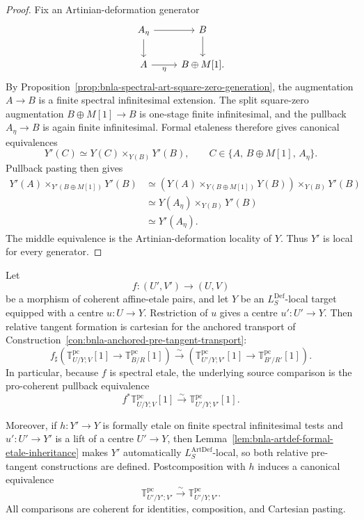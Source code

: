 \begin{proof}
Fix an Artinian-deformation generator
\[
\begin{tikzcd}
A_\eta \arrow[r] \arrow[d] & B \arrow[d]\\
A \arrow[r,"\eta"'] & B\oplus M[1].
\end{tikzcd}
\]
By Proposition~\ref{prop:bnla-spectral-art-square-zero-generation}, the
augmentation $A\to B$ is a finite spectral infinitesimal extension.  The
split square-zero augmentation $B\oplus M[1]\to B$ is one-stage finite
infinitesimal, and the pullback $A_\eta\to B$ is again finite infinitesimal.
Formal etaleness therefore gives canonical equivalences
\[
    Y'(C)
    \simeq
    Y(C)\times_{Y(B)}Y'(B),
    \qquad
    C\in\{A,\,B\oplus M[1],\,A_\eta\}.
\]
Pullback pasting then gives
\[
\begin{aligned}
    Y'(A)\times_{Y'(B\oplus M[1])}Y'(B)
    &\simeq
    \left(
        Y(A)\times_{Y(B\oplus M[1])}Y(B)
    \right)
    \times_{Y(B)}Y'(B)\\
    &\simeq
    Y(A_\eta)\times_{Y(B)}Y'(B)\\
    &\simeq
    Y'(A_\eta).
\end{aligned}
\]
The middle equivalence is the Artinian-deformation locality of $Y$.  Thus
$Y'$ is local for every generator.
\end{proof}

\begin{theorem}
\label{thm:bnla-pre-tangent-etale-base-change}
Let
\[
    f:(U',V')\longrightarrow(U,V)
\]
be a morphism of coherent affine-etale pairs, and let $Y$ be an
$L_S^{\mathrm{Def}}$-local target equipped with a centre $u:U\to Y$.
Restriction of $u$ gives a centre $u':U'\to Y$.  Then relative tangent
formation is cartesian for the anchored transport of
Construction~\ref{con:bnla-anchored-pre-tangent-transport}:
\[
\boxed{
    f_\sharp
    \left(
        \mathbb T^{\mathrm{pc}}_{U/Y;V}[1]
        \longrightarrow
        \mathbb T^{\mathrm{pc}}_{B/R}[1]
    \right)
    \xrightarrow{\sim}
    \left(
        \mathbb T^{\mathrm{pc}}_{U'/Y;V'}[1]
        \longrightarrow
        \mathbb T^{\mathrm{pc}}_{B'/R'}[1]
    \right).}
\]
In particular, because $f$ is spectral etale, the underlying source
comparison is the pro-coherent pullback equivalence
\[
\boxed{
    f^*\mathbb T^{\mathrm{pc}}_{U/Y;V}[1]
    \xrightarrow{\sim}
    \mathbb T^{\mathrm{pc}}_{U'/Y;V'}[1].}
\]

Moreover, if $h:Y'\to Y$ is formally etale on finite spectral infinitesimal
tests and $u':U'\to Y'$ is a lift of a centre $U'\to Y$, then
Lemma~\ref{lem:bnla-artdef-formal-etale-inheritance} makes $Y'$ automatically
$L^{\mathrm{ArtDef}}_S$-local, so both relative pre-tangent constructions are
defined.  Postcomposition with $h$ induces a canonical equivalence
\[
\boxed{
    \mathbb T^{\mathrm{pc}}_{U'/Y';V'}
    \xrightarrow{\sim}
    \mathbb T^{\mathrm{pc}}_{U'/Y;V'}.}
\]
All comparisons are coherent for identities, composition, and Cartesian
pasting.
\end{theorem}

